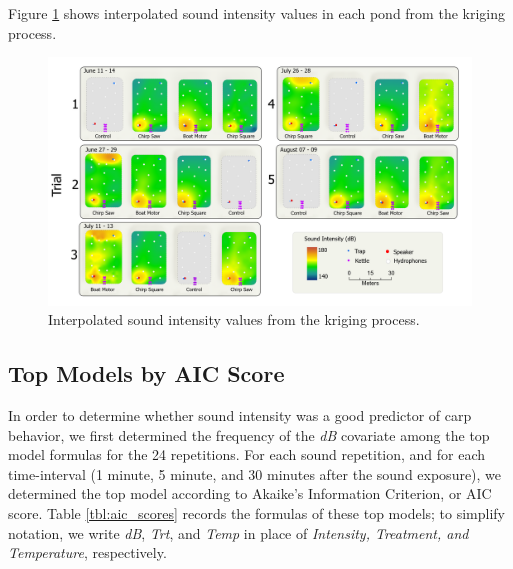 \documentclass[12pt]{article}
\begin{document}
	Figure \ref{img:intensities} shows interpolated sound intensity values in each pond from the kriging process.
	
	\begin{figure}[H]
		\includegraphics[width=\textwidth]{intensities.png}
		\caption{Interpolated sound intensity values from the kriging process.}
		\label{img:intensities}
	\end{figure}		
	
	\subsection{Top Models by AIC Score}
	
	In order to determine whether sound intensity was a good predictor of carp behavior, we first determined the frequency of the \emph{dB} covariate among the top model formulas for the 24 repetitions. For each sound repetition, and for each time-interval (1 minute, 5 minute, and 30 minutes after the sound exposure), we determined the top model according to Akaike's Information Criterion, or AIC score. Table \ref{tbl:aic_scores} records the formulas of these top models; to simplify notation, we write \emph{dB}, \emph{Trt}, and \emph{Temp} in place of \emph{Intensity, Treatment, and Temperature}, respectively.
	
\end{document}

